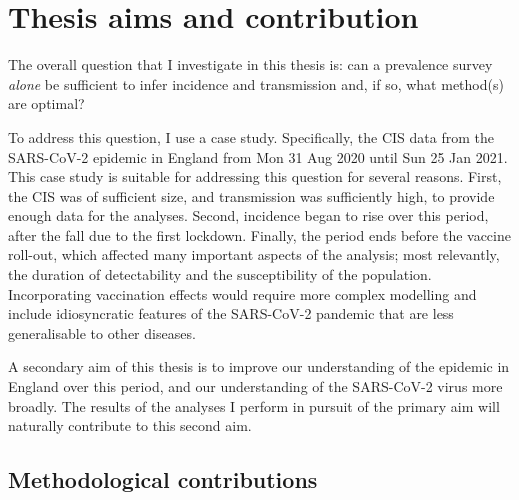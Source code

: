 \documentclass[thesis.tex]{subfiles}
\begin{document}


\section{Thesis aims and contribution} \label{intro:sec:aims}

The overall question that I investigate in this thesis is: can a prevalence survey \emph{alone} be sufficient to infer incidence and transmission and, if so, what method(s) are optimal?

To address this question, I use a case study.
Specifically, the CIS data from the SARS-CoV-2 epidemic in England from Mon 31 Aug 2020 until Sun 25 Jan 2021.
This case study is suitable for addressing this question for several reasons.
First, the CIS was of sufficient size, and transmission was sufficiently high, to provide enough data for the analyses.
Second, incidence began to rise over this period, after the fall due to the first lockdown.
Finally, the period ends before the vaccine roll-out, which  affected many important aspects of the analysis; most relevantly, the duration of detectability and the susceptibility of the population.
Incorporating vaccination effects would require more complex modelling and include idiosyncratic features of the SARS-CoV-2 pandemic that are less generalisable to other diseases.

A secondary aim of this thesis is to improve our understanding of the epidemic in England over this period, and our understanding of the SARS-CoV-2 virus more broadly.
The results of the analyses I perform in pursuit of the primary aim will naturally contribute to this second aim.

\subsection{Methodological contributions}
\end{document}
